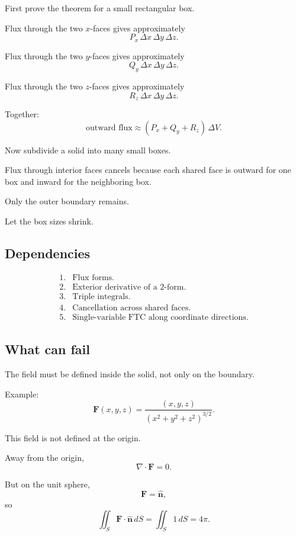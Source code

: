 First prove the theorem for a small rectangular box.

Flux through the two \(x\)-faces gives approximately
\[
    P_x\,\Delta x\,\Delta y\,\Delta z.
\]

Flux through the two \(y\)-faces gives approximately
\[
    Q_y\,\Delta x\,\Delta y\,\Delta z.
\]

Flux through the two \(z\)-faces gives approximately
\[
    R_z\,\Delta x\,\Delta y\,\Delta z.
\]

Together:
\[
    \text{outward flux}
    \approx
    (P_x+Q_y+R_z)\,\Delta V.
\]

Now subdivide a solid into many small boxes.

Flux through interior faces cancels because each shared face is outward for one box and
inward for the neighboring box.

Only the outer boundary remains.

Let the box sizes shrink.

\subsection*{Dependencies}

\[
\begin{array}{ll}
1. & \text{Flux forms.}\\[1mm]
2. & \text{Exterior derivative of a \(2\)-form.}\\[1mm]
3. & \text{Triple integrals.}\\[1mm]
4. & \text{Cancellation across shared faces.}\\[1mm]
5. & \text{Single-variable FTC along coordinate directions.}
\end{array}
\]

\subsection*{What can fail}

The field must be defined inside the solid, not only on the boundary.

Example:
\[
    \mathbf F(x,y,z)
    =
    \frac{(x,y,z)}{(x^2+y^2+z^2)^{3/2}}.
\]

This field is not defined at the origin.

Away from the origin,
\[
    \nabla\cdot\mathbf F=0.
\]

But on the unit sphere,
\[
    \mathbf F=\widehat{\mathbf n},
\]
so
\[
    \iint_S \mathbf F\cdot\widehat{\mathbf n}\,dS
    =
    \iint_S 1\,dS
    =
    4\pi.
\]

